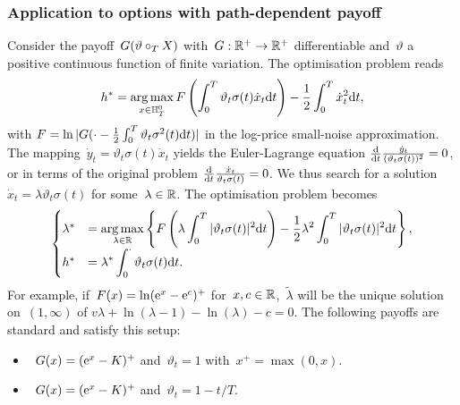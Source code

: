 \subsubsection{\textbf{Application to options with path-dependent payoff}}
\label{ex:BSPathDep}
Consider the payoff~$G(\vartheta\circ_{T}\nobreak X)$ with~$G:\mathbb{R}^+ \to \mathbb{R}^+$ differentiable and~$\vartheta$ 
a positive continuous function of finite variation. 
The optimisation problem reads
$$
h^{*} = \operatorname*{arg\,max}\limits_{x \in \mathbb{H}_T^0} F\left(\int_0^T \vartheta_t \sigma(t) \dot{x}_t \mathrm{d} t\right) - \frac{1}{2}\int_0^T \dot{x}_t^2 \mathrm{d} t,
$$
with %
$F = \ln|G(\cdot - \frac{1}{2}\int_0^T\vartheta_t \sigma^2(t) \mathrm{d} t)|$ in the log-price small-noise approximation. 
The mapping~$\dot{y}_t = \vartheta_t\sigma(t)\dot{x}_t$
yields the Euler-Lagrange equation
$
\frac{\mathrm{d}}{\mathrm{d} t}\frac{\dot{y}_t}{(\vartheta_t\sigma(t))^2} = 0$,
or in terms of the original problem
$\frac{\mathrm{d}}{\mathrm{d} t}\frac{\dot{x}_t}{\vartheta_t\sigma(t)} = 0$.
We thus search for a solution~$\dot{x}_t = \lambda \vartheta_t\sigma(t)$ for some~$\lambda \in\mathbb{R}$. 
The optimisation problem becomes
\[
\begin{cases}
\lambda^{*} &= \displaystyle \operatorname*{arg\,max}\limits_{\lambda \in\mathbb{R}}
\left\{F\left(\lambda \int_0^T |\vartheta_t \sigma(t)|^2 \mathrm{d} t\right)  - \frac{1}{2}\lambda^2 \int_0^T |\vartheta_t \sigma(t)|^2 \mathrm{d} t\right\},\\
h^{*} &= \displaystyle \lambda^{*} \int_0^\cdot \vartheta_t \sigma(t) \mathrm{d} t.
\end{cases}
\]
For example, if~$F(x) = \ln(\mathrm{e}^x - \mathrm{e}^c)^+$ for~$x,c \in\mathbb{R}$,~$\widetilde{\lambda}$ will be the unique solution on~$(1,\infty)$ of
$v\lambda + \ln(\lambda - 1) - \ln(\lambda) - c = 0$.
The following payoffs are standard
and satisfy this setup:
\begin{itemize}
\item {}~$G(x) = (\mathrm{e}^{x} - K)^+$ and~$\vartheta_t=1$ with~$x^+ = \max(0,x)$. 
\item {}~$G(x) = (\mathrm{e}^{x} - K)^+$ and~$\vartheta_t=1 - t/T$. 
\end{itemize}

